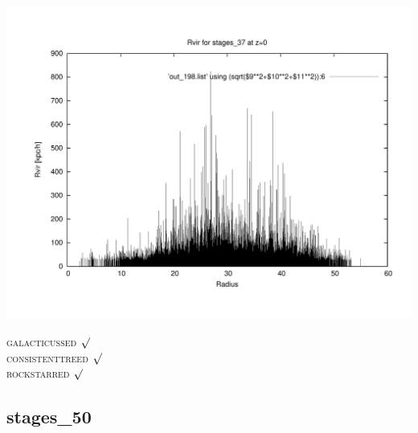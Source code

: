 \includegraphics[scale=0.3]{stages_37/plot_rvir_z0.pdf}

\textsc{galacticussed} $\surd$ \\
\textsc{consistenttreed} $\surd$ \\ 
\textsc{rockstarred} $\surd$


% 
%
%
%
%
%
%
%


\newpage
\subsection{stages\_50}

